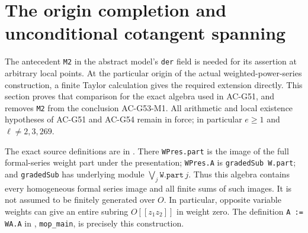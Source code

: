 \section{The origin completion and unconditional cotangent spanning}
\label{sec:cubic-origin-completion}

The antecedent \texttt{M2} in the abstract model's
\texttt{der} field is needed for its assertion at arbitrary
local points.  At the particular origin of the actual
weighted-power-series construction, a finite Taylor
calculation gives the required extension directly.
This section proves that comparison for the exact
algebra used in AC-G51, and removes \texttt{M2} from
the conclusion AC-G53-M1.  All arithmetic and local
existence hypotheses of AC-G51 and AC-G54 remain in
force; in particular $e\geq1$ and
$\ell\ne2,3,269$.

The exact source definitions are in
.
There \texttt{WPres.part} is the image of the full
formal-series weight part under the presentation;
\texttt{WPres.A} is \texttt{gradedSub W.part}; and
\texttt{gradedSub} has underlying module
$\bigvee_j\texttt{W.part}\,j$.
Thus this algebra contains every homogeneous formal
series image and all finite sums of such images.
It is not assumed to be finitely generated over $O$.
In particular, opposite variable weights can give an
entire subring $O[[z_1z_2]]$ in weight zero.
The definition \texttt{A := WA.A} in
,
\texttt{mop\_main}, is precisely this construction.

